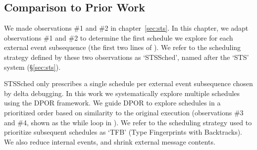 \subsection{Comparison to Prior Work}

We made observations \#1 and \#2 in chapter~\ref{sec:sts}. In this
chapter, we adapt observations \#1 and \#2 to determine the first schedule we
explore for each external event subsequence (the first two lines of ). We refer
to the scheduling strategy defined by these two observations as `STSSched', named
after the `STS' system (\S\ref{sec:sts}).

STSSched only prescribes a single schedule per external event subsequence
chosen by delta debugging. In
this work we systematically explore multiple schedules using the DPOR
framework. We guide DPOR to explore schedules in a prioritized order based on similarity to the original execution
(observations \#3 and \#4, shown as the while loop in ).
We refer to the scheduling strategy used to prioritize subsequent schedules as `TFB' (Type Fingerprints with Backtracks).
We also reduce internal events, and shrink external message contents.


